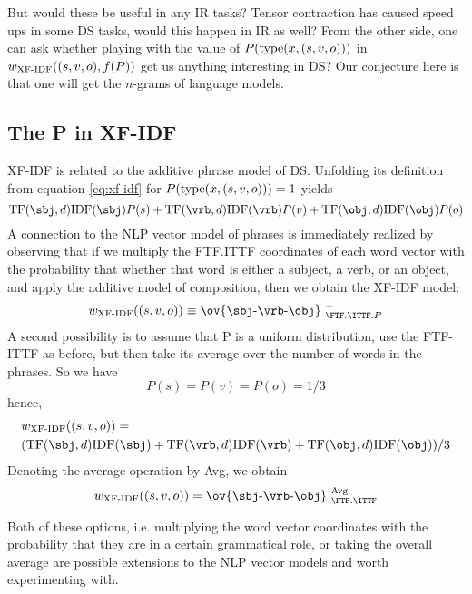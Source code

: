  But would these be useful in any  IR tasks? Tensor contraction has caused speed ups in some DS tasks, would this happen in IR as well? From the other side, one can ask whether playing with the value of $P(\textmd{type}(x,(s,v,o)))$ in $w_\textmd{XF-IDF}((s,v,o), f(P))$  get us anything interesting in DS? Our conjecture here is that one will get the $n$-grams of language models. 
 

\subsection{The P in XF-IDF}
XF-IDF is related to the additive phrase model of DS. Unfolding its definition from  equation \ref{eq:xf-idf} for  $P(\textmd{type}(x,(s,v,o))) = 1$  yields
 \[ 
 \TF(\sbj,d) \IDF(\sbj) P(s) +  \TF(\vrb,d) \IDF(\vrb) P(v) +  \TF(\obj,d) \IDF(\obj) P(o)
 \] 
A  connection to  the NLP vector model of phrases is immediately realized by observing that  if we  multiply the  FTF.ITTF coordinates of each word vector with the probability that whether that word is either  a subject, a verb, or an object, and apply the additive model of composition, then we obtain the XF-IDF model: 
 \[
w_\textmd{XF-IDF}((s,v,o)) \equiv  \ov{\sbj\text{-}\vrb\text{-}\obj}\ _{\FTF.\ITTF.P}^{+} 
 \]
A second possibility is to assume that P is a  uniform distribution, use the FTF-ITTF as before, but then take its average over the number of words in the phrases. So we have
\[
P(s) = P(v) = P(o) = 1/3
\]
hence, 
 \begin{align*}
&w_\textmd{XF-IDF}((s,v,o)) = \\
&(\TF(\sbj,d) \IDF(\sbj) +  \TF(\vrb,d) \IDF(\vrb)  +  \TF(\obj,d) \IDF(\obj))/3
\end{align*}
Denoting the average operation by Avg, we obtain 
\[
w_\textmd{XF-IDF}((s,v,o)) = \ov{\sbj\text{-}\vrb\text{-}\obj}\ _{\FTF.\ITTF}^{\textmd{Avg}}
 \]

Both of these options, i.e. multiplying the word vector coordinates with the probability that they are in a certain grammatical role, or taking the overall average  are  possible extensions to the NLP vector models and worth experimenting with. 


